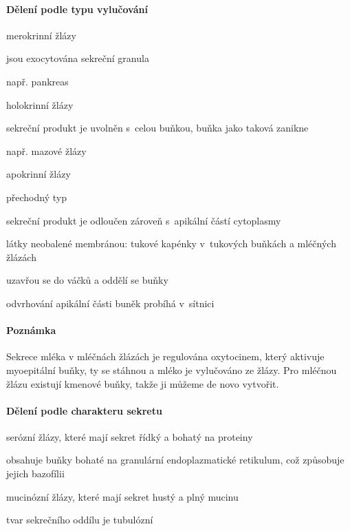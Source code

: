 \documentclass[DIV=8]{scrreprt}
\newcommand{\mybox}[2]{
    \paragraph{#1} #2
}
\begin{document}
\paragraph{Dělení podle typu vylučování}
\begin{myItemize}[nosep]
    \item merokrinní žlázy
\begin{myItemize}[nosep]
    \item jsou exocytována sekreční granula
    \item např. pankreas
\end{myItemize}

    \item holokrinní žlázy
\begin{myItemize}[nosep]
    \item sekreční produkt je uvolněn s celou buňkou, buňka jako taková zanikne
    \item např. mazové žlázy
\end{myItemize}

    \item apokrinní žlázy
\begin{myItemize}[nosep]
    \item přechodný typ
    \item sekreční produkt je odloučen zároveň s apikální částí cytoplasmy
    \item látky neobalené membránou: tukové kapénky v tukových buňkách a mléčných žlázách
    \item uzavřou se do váčků a oddělí se buňky
    \item odvrhování apikální části buněk probíhá v sítnici
\end{myItemize}

\end{myItemize}



\mybox{Poznámka}{Sekrece mléka v mléčnách žlázách je regulována oxytocinem, který aktivuje myoepitální buňky, ty se stáhnou a mléko je vylučováno ze žlázy. Pro mléčnou žlázu existují kmenové buňky, takže ji můžeme de novo vytvořit.}


\paragraph{Dělení podle charakteru sekretu}
\begin{myItemize}[nosep]
    \item serózní žlázy, které mají sekret řídký a bohatý na proteiny
\begin{myItemize}[nosep]
    \item obsahuje buňky bohaté na granulární endoplazmatické retikulum, což způsobuje jejich bazofílii
\end{myItemize}

    \item mucinózní žlázy, které mají sekret hustý a plný mucinu
\begin{myItemize}[nosep]
    \item tvar sekrečního oddílu je tubulózní
\end{myItemize}

\end{myItemize}
\end{document}

